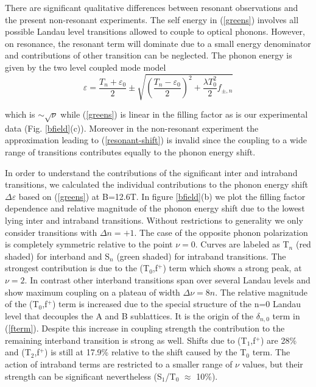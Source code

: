 \documentclass[prl,aps,superscriptaddress,showpacs,reprint]{revtex4-1}
\begin{document}
There are significant qualitative differences between resonant observations and the present non-resonant experiments. The self energy in (\ref{greens}) involves all possible Landau level transitions allowed to couple to optical phonons. However, on resonance,  the resonant term will dominate due to a small energy denominator and contributions of other transition can be neglected. The phonon energy is given by the two level coupled mode model \cite{yan2010observation,PhysRevLett.110.227402}
\begin{equation}
\label{resonant-shift}
\varepsilon=\frac{T_n+\varepsilon_0}{2}\pm\sqrt{\left(\frac{T_n-\varepsilon_0}{2}\right)^2+\frac{\lambda T_0^2}{2}f_{\pm,n}}
\end{equation}

which is $\sim \sqrt{\nu}$ while (\ref{greens}) is linear in the filling factor as is our experimental data (Fig. \ref{bfield}(c)). Moreover in the non-resonant experiment the approximation leading to (\ref{resonant-shift}) is invalid since the coupling to a wide range of transitions contributes equally to the phonon energy shift.

In order to understand the contributions of the significant inter and intraband transitions, we calculated the individual contributions to the phonon energy shift $\Delta\varepsilon$ based on (\ref{greens}) at B=12.6T.
In figure \ref{bfield}(b) we plot the filling factor dependence and relative magnitude of the phonon energy shift due to the lowest lying inter and intraband transitions. Without restrictions to generality we only consider transitions with $\Delta n =+1$. The case of the opposite phonon polarization is completely symmetric relative to the point $\nu = 0$. Curves are labeled as T$_n$ (red shaded) for interband and S$_n$ (green shaded) for intraband transitions.  The strongest contribution is due to the (T$_0$,f$^+$) term which shows a strong peak, at $\nu=2$. In contrast other interband transitions span over several Landau levels and show maximum coupling on a plateau of width $\Delta\nu =8n$. The relative magnitude of the (T$_0$,f$^+$) term is increased due to the special structure of the n=0 Landau level that decouples the A and B sublattices. It is the origin of the $\delta_{n,0}$ term in (\ref{fterm}). Despite this increase in coupling strength the contribution to the remaining interband transition is strong as well. Shifts due to (T$_1$,f$^+$) are 28\% and (T$_2$,f$^+$) is still at 17.9\% relative to the shift caused by the T$_0$ term.
The action of intraband terms are restricted to a smaller range of $\nu$ values, but their strength can be significant nevertheless (S$_1$/T$_0$ $\approx$ 10\%).
\end{document}
